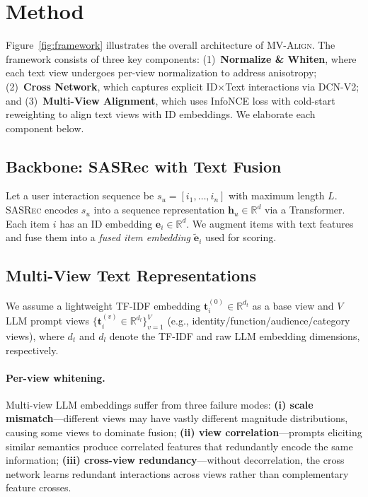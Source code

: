 \documentclass[sigconf,natbib=true]{acmart}
\newcommand{\model}{\textsc{MV-Align}\xspace}
\newcommand{\base}{\textsc{SASRec}\xspace}
\newcommand{\tfidf}{\textsc{TF-IDF}\xspace}
\newcommand{\llm}{\textsc{LLM}\xspace}
\begin{document}
\section{Method}
Figure~\ref{fig:framework} illustrates the overall architecture of \model.
The framework consists of three key components:
(1)~\textbf{Normalize \& Whiten}, where each text view undergoes per-view normalization to address anisotropy;
(2)~\textbf{Cross Network}, which captures explicit ID$\times$Text interactions via DCN-V2;
and (3)~\textbf{Multi-View Alignment}, which uses InfoNCE loss with cold-start reweighting to align text views with ID embeddings.
We elaborate each component below.

\subsection{Backbone: SASRec with Text Fusion}
Let a user interaction sequence be $s_u = [i_1,\dots,i_n]$
with maximum length $L$. \base encodes $s_u$ into a sequence
representation $\mathbf{h}_u \in \mathbb{R}^d$ via a
Transformer. Each item $i$ has an ID embedding
$\mathbf{e}_i \in \mathbb{R}^d$. We augment items with text
features and fuse them into a \emph{fused item embedding}
$\tilde{\mathbf{e}}_i$ used for scoring.

\subsection{Multi-View Text Representations}
We assume a lightweight \tfidf embedding $\mathbf{t}_i^{(0)} \in \mathbb{R}^{d_t}$
as a base view and $V$ \llm prompt views
$\{\mathbf{t}_i^{(v)} \in \mathbb{R}^{d_l}\}_{v=1}^V$ (e.g.,
identity/function/audience/category views), where $d_t$ and $d_l$ denote the
\tfidf and raw \llm embedding dimensions, respectively.

\paragraph{Per-view whitening.}
Multi-view \llm embeddings suffer from three failure modes:
\textbf{(i) scale mismatch}---different views may have vastly
different magnitude distributions, causing some views to
dominate fusion; \textbf{(ii) view correlation}---prompts
eliciting similar semantics produce correlated features that
redundantly encode the same information; \textbf{(iii)
cross-view redundancy}---without decorrelation, the cross
network learns redundant interactions across views rather than
complementary feature crosses.
\end{document}
